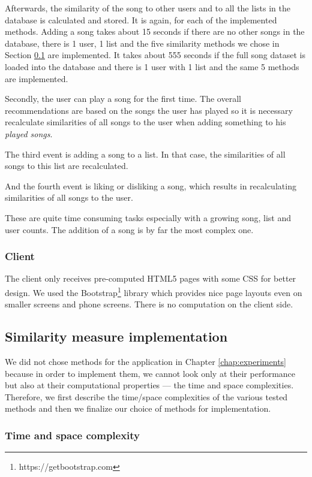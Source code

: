 Afterwards, the similarity of the song to other users and to all the lists in the database is calculated and stored. It is again, for each of the implemented methods. Adding a song takes about 15 seconds if there are no other songs in the database, there is 1 user, 1 list and the five similarity methods we chose in Section \ref{ssec:measure_implementation} are implemented. It takes about 555 seconds if the full song dataset is loaded into the database and there is 1 user with 1 list and the same 5 methods are implemented. 

Secondly, the user can play a song for the first time. The overall recommendations are based on the songs the user has played so it is necessary recalculate similarities of all songs to the user when adding something to his \textit{played songs}.

The third event is adding a song to a list. In that case, the similarities of all songs to this list are recalculated. 

And the fourth event is liking or disliking a song, which results in recalculating similarities of all songs to the user. 

These are quite time consuming tasks especially with a growing song, list and user counts. The addition of a song is by far the most complex one. 

\subsubsection{Client}
The client only receives pre-computed HTML5 pages with some CSS for better design. We used the Bootstrap\footnote{https://getbootstrap.com} library which provides nice page layouts even on smaller screens and phone screens. There is no computation on the client side.

\subsection{Similarity measure implementation}\label{ssec:measure_implementation}

We did not chose methods for the application in Chapter \ref{chap:experiments} because in order to implement them, we cannot look only at their performance but also at their computational properties --- the time and space complexities. Therefore, we first describe the time/space complexities of the various tested methods and then we finalize our choice of methods for implementation.


\subsubsection{Time and space complexity}

